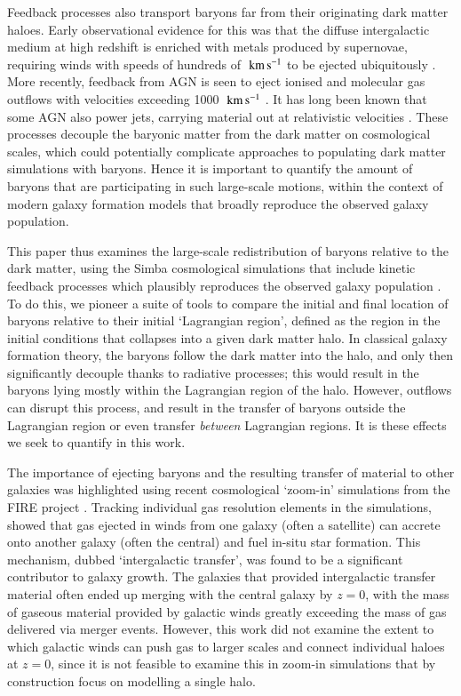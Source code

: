 \documentclass[fleqn,usenatbib]{mnras}
\newcommand{\kms}{\;{\rm km}\,{\rm s}^{-1}}
\newcommand{\simba}{{\sc Simba}}
\begin{document}
Feedback processes also transport baryons far from their originating dark
matter haloes. Early observational evidence for this was that the diffuse
intergalactic medium at high redshift is enriched with metals produced by
supernovae, requiring winds with speeds of hundreds of $\kms{}$ to be ejected
ubiquitously \citep[e.g.][]{Aguirre2001, Springel2003, Oppenheimer2006}. More
recently, feedback from AGN is seen to eject ionised and molecular gas
outflows with velocities exceeding 1000 $\kms{}$
\citep[e.g.][]{Sturm2001, Greene2012, Maiolino2012, Zakamska2016}. It has
long been known that some AGN also power jets, carrying material out at
relativistic velocities \citep{Fabian2012}. These processes decouple the
baryonic matter from the dark matter on cosmological scales, which could
potentially complicate approaches to populating dark matter simulations with
baryons. Hence it is important to quantify the amount of baryons that are
participating in such large-scale motions, within the context of modern
galaxy formation models that broadly reproduce the observed galaxy
population.

This paper thus examines the large-scale redistribution of baryons relative to the
dark matter, using the \simba{} cosmological simulations that include kinetic
feedback processes which plausibly reproduces the observed galaxy population
\citep{Dave2019}. To do this, we pioneer a suite of tools to compare the
initial and final location of baryons relative to their initial `Lagrangian
region', defined as the region in the initial conditions that collapses into
a given dark matter halo. In classical galaxy formation theory, the baryons
follow the dark matter into the halo, and only then significantly decouple
thanks to radiative processes; this would result in the baryons lying mostly
within the Lagrangian region of the halo. However, outflows can disrupt this
process, and result in the transfer of baryons outside the Lagrangian region
or even transfer \emph{between} Lagrangian regions. It is these effects we
seek to quantify in this work.

The importance of ejecting baryons and the resulting transfer of material to
other galaxies was highlighted using recent cosmological `zoom-in'
simulations from the FIRE project \citep{Hopkins2014,Hopkins2018}. Tracking
individual gas resolution elements in the simulations,
\citet{AnglesAlcazar2017} showed that gas ejected in winds from one galaxy
(often a satellite) can accrete onto another galaxy (often the central) and
fuel in-situ star formation. This mechanism, dubbed `intergalactic transfer',
was found to be a significant contributor to galaxy growth. The galaxies that
provided intergalactic transfer material often ended up merging with the
central galaxy by $z=0$, with the mass of gaseous material provided by
galactic winds greatly exceeding the mass of gas delivered via merger events.
However, this work did not examine the extent to which galactic winds can
push gas to larger scales and connect individual haloes at $z=0$, since it is
not feasible to examine this in zoom-in simulations that by construction
focus on modelling a single halo.
\end{document}
